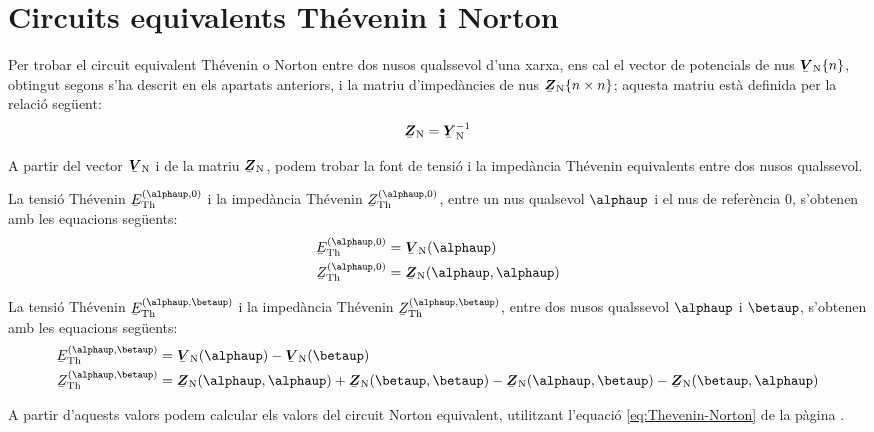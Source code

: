 \section{Circuits equivalents Th\'{e}venin i Norton}   \label{sec:xarxes_Zth}

Per trobar el
circuit equivalent Th\'{e}venin o Norton entre dos nusos qualssevol
d'una xarxa, ens cal el vector de potencials de nus
$\mcmplx{V}\ped{N}\{n\}$, obtingut segons s'ha descrit en els
apartats anteriors, i la matriu d'imped\`{a}ncies de nus
$\mcmplx{Z}\ped{N}\{n\times n\}$; aquesta matriu est\`{a} definida per
la relaci\'{o} seg\"{u}ent:
\begin{equation}
   \mcmplx{Z}\ped{N} = \mcmplx{Y}\ped{N}^{-1}
\end{equation}

A partir del vector $\mcmplx{V}\ped{N}$ i de la matriu
$\mcmplx{Z}\ped{N}$, podem trobar la font de tensi\'{o} i la imped\`{a}ncia
Th\'{e}venin equivalents entre dos nusos qualssevol.

La tensi\'{o} Th\'{e}venin $\cmplx{E}\ped{Th}^{(\alphaup,0)}$ i la imped\`{a}ncia
Th\'{e}venin $\cmplx{Z}\ped{Th}^{(\alphaup,0)}$, entre  un nus qualsevol
$\alphaup$ i el nus de refer\`{e}ncia 0, s'obtenen amb les equacions
seg\"{u}ents:
\begin{align}
    \cmplx{E}\ped{Th}^{(\alphaup,0)} &= \mcmplx{V}\ped{N}(\alphaup) \\
    \cmplx{Z}\ped{Th}^{(\alphaup,0)} &= \mcmplx{Z}\ped{N}(\alphaup,\alphaup)
\end{align}

La tensi\'{o} Th\'{e}venin $\cmplx{E}\ped{Th}^{(\alphaup,\betaup)}$ i la
imped\`{a}ncia Th\'{e}venin $\cmplx{Z}\ped{Th}^{(\alphaup,\betaup)}$, entre dos
nusos qualssevol $\alphaup$ i $\betaup$, s'obtenen amb les equacions
seg\"{u}ents:
\begin{align}
    \cmplx{E}\ped{Th}^{(\alphaup,\betaup)} &= \mcmplx{V}\ped{N}(\alphaup) - \mcmplx{V}\ped{N}(\betaup) \\
    \cmplx{Z}\ped{Th}^{(\alphaup,\betaup)} &= \mcmplx{Z}\ped{N}(\alphaup,\alphaup) +
    \mcmplx{Z}\ped{N}(\betaup,\betaup) - \mcmplx{Z}\ped{N}(\alphaup,\betaup) -
    \mcmplx{Z}\ped{N}(\betaup,\alphaup)
\end{align}

A partir d'aquests valors podem calcular els valors del circuit Norton equivalent, utilitzant l'equaci\'{o} \eqref{eq:Thevenin-Norton} de la p\`{a}gina \pageref{eq:Thevenin-Norton}.

